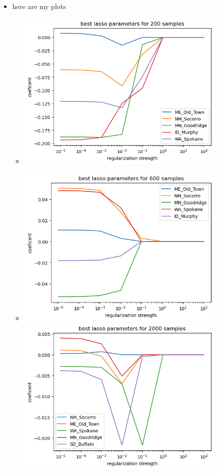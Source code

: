 \documentclass[12pt,twoside]{article}
\begin{document}
\begin{enumerate}
\begin{enumerate}
\begin{itemize}
\item here are my plots
\begin{itemize}
    \item \includegraphics[width=10cm]{homework/homework_12/immages/hw_12_6.png}
        \item \includegraphics[width=10cm]{homework/homework_12/immages/hw_12_7.png}
            \\ \includegraphics[width=10cm]{homework/homework_12/immages/hw_12_8.png}

\end{itemize}
\end{itemize}
\end{enumerate}
\end{enumerate}
\end{document}
